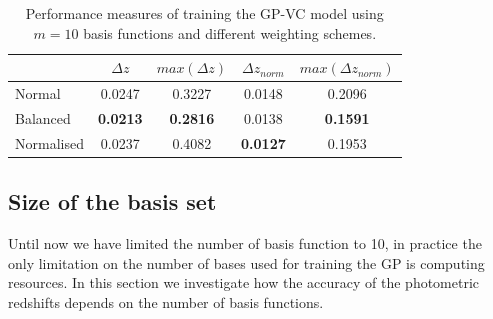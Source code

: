 \documentclass[useAMS,usenatbib,fleqn]{mn2e}
\begin{document}
 \begin{table}
\caption{Performance measures of training the GP-VC model using $m=10$ basis functions and different weighting schemes.}
\begin{center}
  \begin{tabular}{| l | c | c | c | c |}
     				&	$\Delta z$	&	$max\left(\Delta z\right)$		&	$\Delta z_{norm}$		&	$max\left(\Delta z_{norm}\right)$	\\	\hline
	Normal		&	0.0247		&	0.3227			&	0.0148				&	0.2096				\\
	Balanced		&	\textbf{0.0213}	&	\textbf{0.2816}		&	0.0138				&	\textbf{0.1591}			\\
	Normalised	&	0.0237		&	0.4082			&	\textbf{0.0127}			&	0.1953				\\	\hline
  \end{tabular}
\end{center}
\label{table-normal-balanced}
\end{table}

\subsection{Size of the basis set}
Until now we have limited the number of basis function to 10, in practice the only limitation on the number of bases used for training the GP is computing resources. In this section we investigate how the accuracy of the photometric redshifts depends on the number of basis functions.
\end{document}
